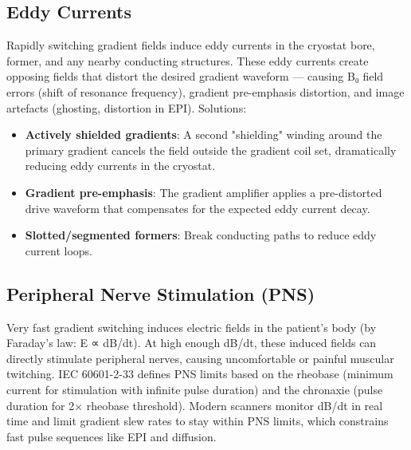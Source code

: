       

\subsection{Eddy Currents}

      

Rapidly switching gradient fields induce eddy currents in the cryostat bore, former, and any nearby conducting structures. These eddy currents create opposing fields that distort the desired gradient waveform — causing B₀ field errors (shift of resonance frequency), gradient pre-emphasis distortion, and image artefacts (ghosting, distortion in EPI). Solutions:


      
\begin{itemize}

        \item \textbf{Actively shielded gradients}: A second "shielding" winding around the primary gradient cancels the field outside the gradient coil set, dramatically reducing eddy currents in the cryostat.

        \item \textbf{Gradient pre-emphasis}: The gradient amplifier applies a pre-distorted drive waveform that compensates for the expected eddy current decay.

        \item \textbf{Slotted/segmented formers}: Break conducting paths to reduce eddy current loops.

      
\end{itemize}

      

\subsection{Peripheral Nerve Stimulation (PNS)}

      

Very fast gradient switching induces electric fields in the patient's body (by Faraday's law: E ∝ dB/dt). At high enough dB/dt, these induced fields can directly stimulate peripheral nerves, causing uncomfortable or painful muscular twitching. IEC 60601-2-33 defines PNS limits based on the rheobase (minimum current for stimulation with infinite pulse duration) and the chronaxie (pulse duration for 2× rheobase threshold). Modern scanners monitor dB/dt in real time and limit gradient slew rates to stay within PNS limits, which constrains fast pulse sequences like EPI and diffusion.

